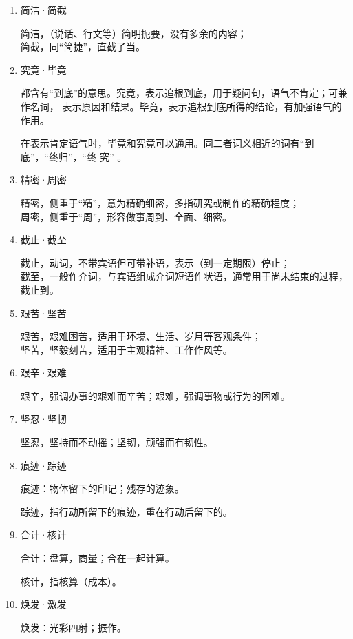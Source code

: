 \documentclass[final,oneside]{ctexbook}
\begin{document}
\begin{enumerate}
  \item 简洁·简截

    简洁，（说话、行文等）简明扼要，没有多余的内容；\\
    简截，同“简捷”，直截了当。

  \item 究竟·毕竟

    都含有“到底”的意思。究竟，表示追根到底，用于疑问句，语气不肯定；可兼作名词，
    表示原因和结果。毕竟，表示追根到底所得的结论，有加强语气的作用。

    在表示肯定语气时，毕竟和究竟可以通用。同二者词义相近的词有“到底”，“终归”，“终
    究” 。

  \item 精密·周密

    精密，侧重于“精”，意为精确细密，多指研究或制作的精确程度；\\
    周密，侧重于“周”，形容做事周到、全面、细密。

  \item 截止·截至

    截止，动词，不带宾语但可带补语，表示（到一定期限）停止；\\
    截至，一般作介词，与宾语组成介词短语作状语，通常用于尚未结束的过程，截止到。

  \item 艰苦·坚苦

    艰苦，艰难困苦，适用于环境、生活、岁月等客观条件；\\
    坚苦，坚毅刻苦，适用于主观精神、工作作风等。

  \item 艰辛·艰难

    艰辛，强调办事的艰难而辛苦；艰难，强调事物或行为的困难。

  \item 坚忍·坚韧

    坚忍，坚持而不动摇；坚韧，顽强而有韧性。

  \item 痕迹·踪迹

    痕迹：物体留下的印记；残存的迹象。

    踪迹，指行动所留下的痕迹，重在行动后留下的。

  \item 合计·核计

    合计：盘算，商量；合在一起计算。

    核计，指核算（成本）。

  \item 焕发·激发

    焕发：光彩四射；振作。


\end{enumerate}
\end{document}
